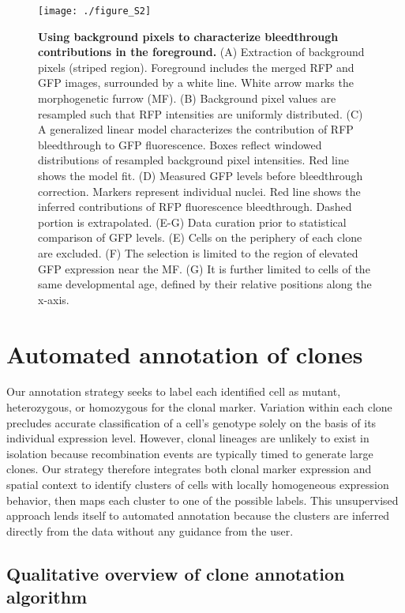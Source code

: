 \begin{figure}[h]
\texttt{[image: ./figure\_S2]}
\caption[Characterization of bleedthrough contribution strengths.]{\textbf{Using background pixels to characterize bleedthrough contributions in the foreground.} (A) Extraction of background pixels (striped region). Foreground includes the merged RFP and GFP images, surrounded by a white line. White arrow marks the morphogenetic furrow (MF). (B) Background pixel values are resampled such that RFP intensities are uniformly distributed. (C) A generalized linear model characterizes the contribution of RFP bleedthrough to GFP fluorescence. Boxes reflect windowed distributions of resampled background pixel intensities. Red line shows the model fit. (D) Measured GFP levels before bleedthrough correction. Markers represent individual nuclei. Red line shows the inferred contributions of RFP fluorescence bleedthrough. Dashed portion is extrapolated. (E-G) Data curation prior to statistical comparison of GFP levels. (E) Cells on the periphery of each clone are excluded. (F) The selection is limited to the region of elevated GFP expression near the MF. (G) It is further limited to cells of the same developmental age, defined by their relative positions along the x-axis.}
\label{fig:clones:figS2}
\end{figure}

\section{Automated annotation of clones}
\label{ch:clones:annotation}

Our annotation strategy seeks to label each identified cell as mutant, heterozygous, or homozygous for the clonal marker. Variation within each clone precludes accurate classification of a cell's genotype solely on the basis of its individual expression level. However, clonal lineages are unlikely to exist in isolation because recombination events are typically timed to generate large clones. Our strategy therefore integrates both clonal marker expression and spatial context to identify clusters of cells with locally homogeneous expression behavior, then maps each cluster to one of the possible labels. This unsupervised approach lends itself to automated annotation because the clusters are inferred directly from the data without any guidance from the user.

\subsection{Qualitative overview of clone annotation algorithm} 
\label{clones:methods:annotation}


